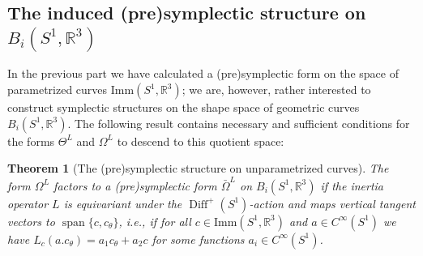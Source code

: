 \documentclass[12pt]{amsart}
\newcommand{\AuthorCOMMENT}[3]{\textcolor{#2}{{[\textbf{#1:} \textsl{#3}}]}}  %
\newcommand{\cMB}[1]{\AuthorCOMMENT{Martin}{blue}{#1}}
\newcommand{\cPM}[1]{\AuthorCOMMENT{Peter}{olive}{#1}}
\newcommand{\rev}[1]{#1}
\newtheorem{theorem}{Theorem}[section]
\theoremstyle{definition}
\newcommand{\Diffp}{\operatorname{Diff}^+(S^1)}
\newcommand{\Imm}{\mathrm{Imm}}
\def\Th{\Theta}
\def\Om{\Omega}
\let\on=\operatorname
\begin{document}



\subsection*{The induced (pre)symplectic structure on $B_i(S^1,\mathbb R^3)$}\label{symplectic_shape}
In the previous part we have calculated a (pre)symplectic form on the space of parametrized curves $\Imm(S^1,\mathbb R^3)$; we are, however, rather interested to construct symplectic structures on the shape space of geometric curves $B_i(S^1,\mathbb R^3)$. The following result contains necessary and sufficient conditions for the forms $\Th^L$ and $\Om^L$ to descend to this quotient space:

\begin{theorem}[The (pre)symplectic structure on unparametrized curves]\label{th:descending_presymplectic_form}
The form $\Om^L$ factors to a (pre)symplectic form $\bar\Om^L$ on $B_i(S^1,\mathbb R^3)$ if the inertia operator $L$ \rev{is equivariant under the $\Diffp$-action and} maps vertical tangent vectors to $\operatorname{span}\{c,c_\theta\}$, i.e., if for all $c\in \Imm(S^1,\mathbb R^3)$ and $a\in C^{\infty}(S^1)$ we have
$L_c(a.c_\theta)=a_1 c_\theta+a_2 c$ for some functions $a_i\in C^{\infty}(S^1)$.
\end{theorem}
\end{document}
